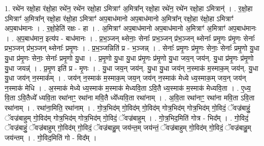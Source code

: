 \documentclass[17pt]{extarticle}
\begin{document}
1. रथे॑न रक्षो॒हा र॑क्षो॒हा रथे॑न॒ रथे॑न रक्षो॒हा ऽमित्राꣳ॑ अ॒मित्रा᳚न् रक्षो॒हा रथे॑न॒ रथे॑न रक्षो॒हा ऽमित्रान्॑ । . र॒क्षो॒हा ऽमित्राꣳ॑ अ॒मित्रा᳚न् रक्षो॒हा र॑क्षो॒हा ऽमित्राꣳ॑ अप॒बाध॑मानो अप॒बाध॑मानो अ॒मित्रा᳚न् रक्षो॒हा र॑क्षो॒हा ऽमित्राꣳ॑ अप॒बाध॑मानः । . र॒क्षो॒हेति॑ रक्षः - हा । . अ॒मित्राꣳ॑ अप॒बाध॑मानो अप॒बाध॑मानो अ॒मित्राꣳ॑ अ॒मित्राꣳ॑ अप॒बाध॑मानः । . अ॒प॒बाध॑मान॒ इत्य॑प - बाध॑मानः । . प्र॒भ॒ञ्जन् थ्सेनाः॒ सेनाः᳚ प्रभ॒ञ्जन् प्र॑भ॒ञ्जन् थ्सेनाः᳚ प्रमृ॒णः प्र॑मृ॒णः सेनाः᳚ प्रभ॒ञ्जन् प्र॑भ॒ञ्जन् थ्सेनाः᳚ प्रमृ॒णः । . प्र॒भ॒ञ्जन्निति॑ प्र - भ॒ञ्जन्न् । . सेनाः᳚ प्रमृ॒णः प्र॑मृ॒णः सेनाः॒ सेनाः᳚ प्रमृ॒णो यु॒धा यु॒धा प्र॑मृ॒णः सेनाः॒ सेनाः᳚ प्रमृ॒णो यु॒धा । . प्र॒मृ॒णो यु॒धा यु॒धा प्र॑मृ॒णः प्र॑मृ॒णो यु॒धा जय॒न् जय॑न्. यु॒धा प्र॑मृ॒णः प्र॑मृ॒णो यु॒धा जयन्न्॑ । . प्र॒मृ॒ण इति॑ प्र - मृ॒णः । . यु॒धा जय॒न् जय॑न्. यु॒धा यु॒धा जय॑न् न॒स्माक॑ म॒स्माक॒म् जय॑न्. यु॒धा यु॒धा जय॑न् न॒स्माक᳚म् । . जय॑न् न॒स्माक॑ म॒स्माक॒म् जय॒न् जय॑न् न॒स्माक॑ मेध्ये ध्य॒स्माक॒म् जय॒न् जय॑न् न॒स्माक॑ मेधि । . अ॒स्माक॑ मेध्ये ध्य॒स्माक॑ म॒स्माक॑ मेध्यवि॒ता ऽवि॒तै ध्य॒स्माक॑ म॒स्माक॑ मेध्यवि॒ता । . ए॒ध्य॒ वि॒ता ऽवि॒तैध्ये᳚ ध्यवि॒ता रथा॑नाꣳ॒॒ रथा॑ना मवि॒तै ध्ये᳚ध्यवि॒ता रथा॑नाम् । . अ॒वि॒ता रथा॑नाꣳ॒॒ रथा॑ना मवि॒ता ऽवि॒ता रथा॑नाम् । . रथा॑ना॒मिति॒ रथा॑नाम् । . गो॒त्र॒भिद॑म् गो॒विद॑म् गो॒विद॑म् गोत्र॒भिद॑म् गोत्र॒भिद॑म् गो॒विदं॒ ॅवज्र॑बाहुं॒ ॅवज्र॑बाहुम् गो॒विद॑म् गोत्र॒भिद॑म् गोत्र॒भिद॑म् गो॒विदं॒ ॅवज्र॑बाहुम् । . गो॒त्र॒भिद॒मिति॑ गोत्र - भिद᳚म् । . गो॒विदं॒ ॅवज्र॑बाहुं॒ ॅवज्र॑बाहुम् गो॒विद॑म् गो॒विदं॒ ॅवज्र॑बाहु॒म् जय॑न्त॒म् जय॑न्तं॒ ॅवज्र॑बाहुम् गो॒विद॑म् गो॒विदं॒ ॅवज्र॑बाहु॒म् जय॑न्तम् । . गो॒विद॒मिति॑ गो - विद᳚म् । \newline
\end{document}
